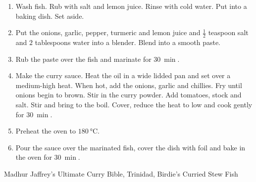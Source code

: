 \documentclass[11pt,a4paper]{article}
\begin{document}
\begin{enumerate}
  \item Wash fish. Rub with salt and lemon juice. Rinse with cold water. Put
  into a baking dish. Set aside.
  \item Put the onions, garlic, pepper, turmeric and lemon juice and $
  \frac{1}{2} $ teaspoon salt and $ 2 $ tablespoons water into a blender. Blend
  into a smooth paste.
  \item Rub the paste over the fish and marinate for $ \qty{30}{\min} $.
  \item Make the curry sauce. Heat the oil in a wide lidded pan and set over a
  medium-high heat. When hot, add the onions, garlic and chillies. Fry until
  onions begin to brown. Stir in the curry powder. Add tomatoes, stock and salt.
  Stir and bring to the boil. Cover, reduce the heat to low and cook gently for
  $ \qty{30}{\min} $.
  \item Preheat the oven to $ \qty{180}{\celsius} $.
  \item Pour the sauce over the marinated fish, cover the dish with foil and
  bake in the oven for $ \qty{30}{\min} $.
\end{enumerate}

Madhur Jaffrey's Ultimate Curry Bible, Trinidad, Birdie's Curried Stew Fish
\end{document}
